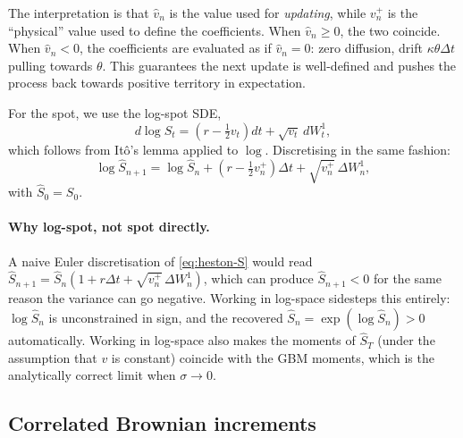 \documentclass[11pt]{article}
\theoremstyle{plain}
\theoremstyle{definition}
\theoremstyle{remark}
\begin{document}
The interpretation is that $\hat v_n$ is the value used for \emph{updating}, while $v_n^+$ is the ``physical'' value used to define the coefficients. When $\hat v_n \geq 0$, the two coincide. When $\hat v_n < 0$, the coefficients are evaluated as if $\hat v_n = 0$: zero diffusion, drift $\kappa\theta\Delta t$ pulling towards $\theta$. This guarantees the next update is well-defined and pushes the process back towards positive territory in expectation.

For the spot, we use the log-spot SDE,
\begin{equation}
    d \log S_t = \left(r - \tfrac12 v_t\right) dt + \sqrt{v_t}\,dW^1_t,         \label{eq:logS}
\end{equation}
which follows from Itô's lemma applied to $\log$. Discretising in the same fashion:
\begin{equation}
    \log \hat S_{n+1} = \log \hat S_n + \left(r - \tfrac12 v_n^+\right) \Delta t + \sqrt{v_n^+}\,\Delta W^1_n,   \label{eq:ft-S}
\end{equation}
with $\hat S_0 = S_0$.

\paragraph{Why log-spot, not spot directly.} A naive Euler discretisation of \eqref{eq:heston-S} would read $\hat S_{n+1} = \hat S_n(1 + r\Delta t + \sqrt{v_n^+}\,\Delta W^1_n)$, which can produce $\hat S_{n+1} < 0$ for the same reason the variance can go negative. Working in log-space sidesteps this entirely: $\log \hat S_n$ is unconstrained in sign, and the recovered $\hat S_n = \exp(\log \hat S_n) > 0$ automatically. Working in log-space also makes the moments of $\hat S_T$ (under the assumption that $v$ is constant) coincide with the GBM moments, which is the analytically correct limit when $\sigma \to 0$.

\subsection{Correlated Brownian increments}
\end{document}
